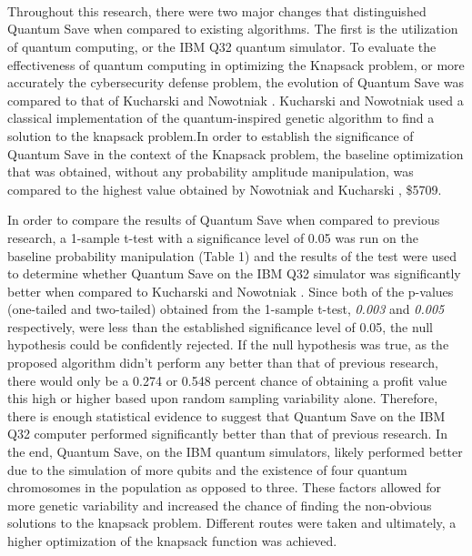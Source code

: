 \section*{\color{SectionBlue}{Analysis}} \label{sec:sections}
\subsection*{\color{SubSectionBlue}{Hyperparameters}}
 \\

Throughout this research, there were two major changes that distinguished Quantum Save when compared to existing algorithms. The first is the utilization of quantum computing, or the IBM Q32 quantum simulator. To evaluate the effectiveness of quantum computing in optimizing the Knapsack problem, or more accurately the cybersecurity defense problem, the evolution of Quantum Save was compared to that of Kucharski and Nowotniak \cite{nowotniak_higher-order_2014}. 
Kucharski and Nowotniak \cite{nowotniak_higher-order_2014} used a classical implementation of the quantum-inspired genetic algorithm to find a solution to the knapsack problem.In order to establish the significance of Quantum Save in the context of the Knapsack problem, the baseline optimization that was obtained, without any probability amplitude manipulation, was compared to the highest value obtained by Nowotniak and Kucharski \cite{nowotniak_higher-order_2014}, \$5709.

\vspace{1mm}

In order to compare the results of Quantum Save when compared to previous research, a 1-sample t-test with a significance level of 0.05 was run on the baseline probability manipulation (Table 1) and the results of the test were used to determine whether Quantum Save on the IBM Q32 simulator was significantly better when compared to Kucharski and Nowotniak \cite{nowotniak_higher-order_2014}. Since both of the p-values (one-tailed and two-tailed) obtained from the 1-sample t-test, \textit{0.003} and \textit{0.005} respectively, were less than the established significance level of 0.05, the null hypothesis could be confidently rejected. If the null hypothesis was true, as the proposed algorithm didn’t perform any better than that of previous research, there would only be a 0.274 or 0.548 percent chance of obtaining a profit value this high or higher based upon random sampling variability alone. Therefore, there is enough statistical evidence to suggest that Quantum Save on the IBM Q32 computer performed significantly better than that of previous research. In the end, Quantum Save, on the IBM quantum simulators, likely performed better due to the simulation of more qubits and the existence of four quantum chromosomes in the population as opposed to three. These factors allowed for more genetic variability and increased the chance of finding the non-obvious solutions to the knapsack problem. Different routes were taken and ultimately, a higher optimization of the knapsack function was achieved. 

